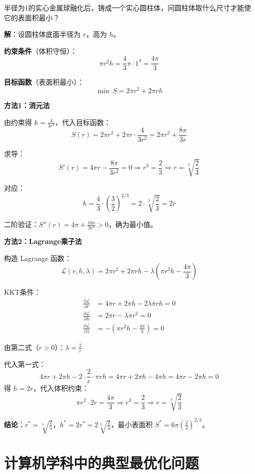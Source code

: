 \begin{example}[球的表面积最小化问题]\label{ex:sphere-cylinder}
半径为1的实心金属球融化后，铸成一个实心圆柱体，问圆柱体取什么尺寸才能使它的表面积最小？

\textbf{解}：设圆柱体底面半径为 $r$，高为 $h$。

\textbf{约束条件}（体积守恒）：
\[
\pi r^2 h = \frac{4}{3}\pi \cdot 1^3 = \frac{4\pi}{3}
\]

\textbf{目标函数}（表面积最小）：
\[
\min\ S = 2\pi r^2 + 2\pi rh
\]

\textbf{方法1：消元法}

由约束得 $h = \frac{4}{3r^2}$，代入目标函数：
\[
S(r) = 2\pi r^2 + 2\pi r \cdot \frac{4}{3r^2} = 2\pi r^2 + \frac{8\pi}{3r}
\]

求导：
\[
S'(r) = 4\pi r - \frac{8\pi}{3r^2} = 0 \Rightarrow r^3 = \frac{2}{3} \Rightarrow r = \sqrt[3]{\frac{2}{3}}
\]

对应：
\[
h = \frac{4}{3} \cdot \left(\frac{3}{2}\right)^{2/3} = 2 \cdot \sqrt[3]{\frac{2}{3}} = 2r
\]

二阶验证：$S''(r) = 4\pi + \frac{16\pi}{3r^3} > 0$，确为最小值。

\textbf{方法2：Lagrange乘子法}

构造 Lagrange 函数：
\[
\mathcal{L}(r, h, \lambda) = 2\pi r^2 + 2\pi rh - \lambda\left(\pi r^2 h - \frac{4\pi}{3}\right)
\]

KKT条件：
\begin{align*}
\frac{\partial \mathcal{L}}{\partial r} &= 4\pi r + 2\pi h - 2\lambda\pi r h = 0 \\
\frac{\partial \mathcal{L}}{\partial h} &= 2\pi r - \lambda\pi r^2 = 0 \\
\frac{\partial \mathcal{L}}{\partial \lambda} &= -\left(\pi r^2 h - \frac{4\pi}{3}\right) = 0
\end{align*}

由第二式（$r > 0$）：$\lambda = \frac{2}{r}$

代入第一式：
\[
4\pi r + 2\pi h - 2 \cdot \frac{2}{r} \cdot \pi r h = 4\pi r + 2\pi h - 4\pi h = 4\pi r - 2\pi h = 0
\]
得 $h = 2r$，代入体积约束：
\[
\pi r^2 \cdot 2r = \frac{4\pi}{3} \Rightarrow r^3 = \frac{2}{3} \Rightarrow r = \sqrt[3]{\frac{2}{3}}
\]

\textbf{结论}：$r^* = \sqrt[3]{\frac{2}{3}}$，$h^* = 2r^* = 2\sqrt[3]{\frac{2}{3}}$，最小表面积 $S^* = 6\pi\left(\frac{2}{3}\right)^{2/3}$。
\end{example}

\section{计算机学科中的典型最优化问题}\label{sec:cs-applications}

